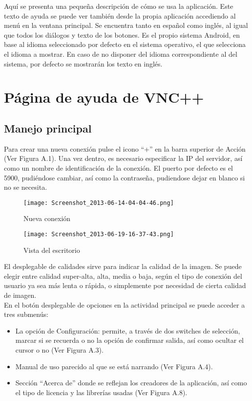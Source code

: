 Aquí se presenta una pequeña descripción de cómo se usa la aplicación. Este texto de ayuda se puede ver también desde la propia aplicación accediendo al menú en la ventana principal. Se encuentra tanto en español como inglés, al igual que todos los diálogos y texto de los botones. Es el propio sistema Android, en base al idioma seleccionado por defecto en el sistema operativo, el que selecciona el idioma a mostrar. En caso de no disponer del idioma correspondiente al del sistema, por defecto se mostrarán los texto en inglés.
\section{Página de ayuda de VNC++}
\subsection{Manejo principal}
Para crear una nueva conexión pulse el icono ``+'' en la barra superior de Acción (Ver Figura A.1). Una vez dentro, es necesario especificar la IP del servidor, así como un nombre de identificación de la conexión. El puerto por defecto es el 5900, pudiéndose cambiar, así como la contraseña, pudiendose dejar en blanco si no se necesita.
\begin{figure}[h]
\hfill
\begin{minipage}[t]{.45\textwidth}
\begin{center}
\texttt{[image: Screenshot\_2013-06-14-04-04-46.png]}
\caption{Nueva conexión}
\end{center}
\end{minipage}
\hfill
\begin{minipage}[t]{.45\textwidth}
\begin{center}
\texttt{[image: Screenshot\_2013-06-19-16-37-43.png]}
\caption{Vista del escritorio}
\end{center}
\end{minipage}
\hfill
\end{figure}
\newpage

El desplegable de calidades sirve para indicar la calidad de la imagen. Se puede elegir entre calidad super-alta, alta, media o baja, según el tipo de conexión del usuario ya sea más lenta o rápida, o simplemente por necesidad de cierta calidad de imagen.\\

En el botón desplegable de opciones en la actividad principal se puede acceder a tres submenús:
\begin{itemize}
\item La opción de Configuración: permite, a través de dos switches de selección, marcar si se recuerda o no la opción de confirmar salida, así como ocultar el cursor o no (Ver Figura A.3).
\item Manual de uso parecido al que se está narrando (Ver Figura A.4).
\item Sección “Acerca de” donde se reflejan los creadores de la aplicación, así como el tipo de licencia y las librerías usadas (Ver Figura A.8).
\end{itemize}

